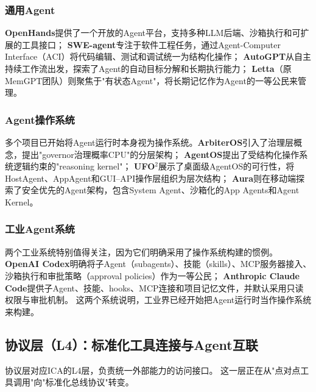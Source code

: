 \subsubsection{通用Agent}

\textbf{OpenHands}提供了一个开放的Agent平台，支持多种LLM后端、沙箱执行和可扩展的工具接口\cite{openhands_paper_2025}；
\textbf{SWE-agent}专注于软件工程任务，通过Agent-Computer Interface（ACI）将代码编辑、测试和调试统一为结构化操作\cite{sweagent2024}；
\textbf{AutoGPT}从自主持续工作流出发，探索了Agent的自动目标分解和长期执行能力\cite{autogpt_platform_2026}；
\textbf{Letta}（原MemGPT团队）则聚焦于"有状态Agent"，将长期记忆作为Agent的一等公民来管理\cite{letta_stateful_2026}。

\subsubsection{Agent操作系统}

多个项目已开始将Agent运行时本身视为操作系统。\textbf{ArbiterOS}引入了治理层概念，提出"governor治理概率CPU"的分层架构\cite{arbiteros2025}；
\textbf{AgentOS}提出了受结构化操作系统逻辑约束的"reasoning kernel"\cite{agentos2025}；
\textbf{UFO$^2$}展示了桌面级AgentOS的可行性，将HostAgent、AppAgent和GUI--API操作层组织为层次结构\cite{ufo2_2025}；
\textbf{Aura}则在移动端探索了安全优先的Agent架构，包含System Agent、沙箱化的App Agents和Agent Kernel\cite{aura2025}。

\subsubsection{工业Agent系统}

两个工业系统特别值得关注，因为它们明确采用了操作系统构建的惯例。\textbf{OpenAI Codex}明确将子Agent（subagents）、技能（skills）、MCP服务器接入、沙箱执行和审批策略（approval policies）作为一等公民\cite{openai_codex_overview_2026,openai_codex_skills_2026,openai_codex_sandbox_2026,openai_codex_approvals_2026}；
\textbf{Anthropic Claude Code}提供子Agent、技能、hooks、MCP连接和项目记忆文件，并默认采用只读权限与审批机制\cite{anthropic_claudecode_overview_2026,anthropic_claudecode_security_2026}。
这两个系统说明，工业界已经开始把Agent运行时当作操作系统来构建。

\subsection{协议层（L4）：标准化工具连接与Agent互联}
\label{sec:impl-protocol}

协议层对应ICA的L4层，负责统一外部能力的访问接口。
这一层正在从"点对点工具调用"向"标准化总线协议"转变。

